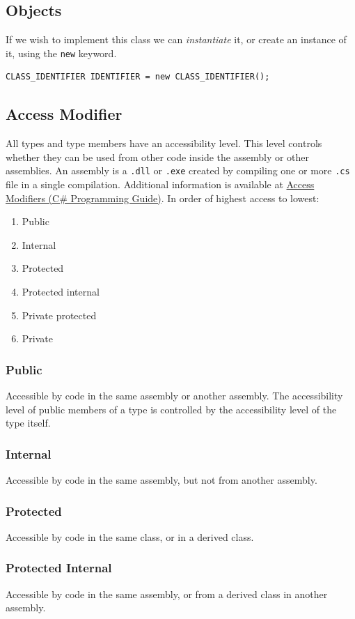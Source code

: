 \documentclass{article}
\begin{document}
\subsection{Objects}
If we wish to implement this class we can \textit{instantiate} it, or
create an instance of it, using the \texttt{new} keyword.
\begin{verbatim}
CLASS_IDENTIFIER IDENTIFIER = new CLASS_IDENTIFIER();
\end{verbatim}
\subsection{Access Modifier}
All types and type members have an accessibility level. This level
controls whether they can be used from other code inside the assembly
or other assemblies. An assembly is a \texttt{.dll} or
\texttt{.exe} created by compiling one or more
\texttt{.cs} file in a single compilation.
Additional information is available at
\href{https://docs.microsoft.com/en-us/dotnet/csharp/programming-guide/classes-and-structs/access-modifiers}{Access
Modifiers (C\# Programming Guide)}. In order of highest access to
lowest:
\begin{enumerate}
    \item Public
    \item Internal
    \item Protected
    \item Protected internal
    \item Private protected
    \item Private
\end{enumerate}
\subsubsection{Public}
Accessible by code in the same assembly or another assembly. The
accessibility level of public members of a type is controlled by the
accessibility level of the type itself.
\subsubsection{Internal}
Accessible by code in the same assembly, but not from another assembly.
\subsubsection{Protected}
Accessible by code in the same class, or in a derived class.
\subsubsection{Protected Internal}
Accessible by code in the same assembly, or from a derived class in
another assembly.
\end{document}
